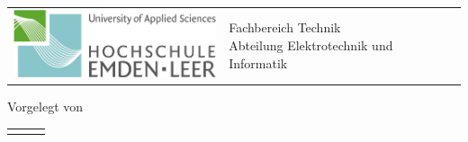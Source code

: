 
\begin{titlepage}

	\hspace{-1.0cm}
	\begin{tabular}{p{8.0cm} p{8.0cm}}
		\includegraphics[width = 6.0cm]{03_Ressourcen/Logo/Technik.png} & %
		\parbox[b]{8.0cm}{
		{\large  Fachbereich Technik }                                    \\ %
		{\large  Abteilung Elektrotechnik und Informatik } %
		}                                                                 \\
		\\
		\hline
	\end{tabular}
	\begin{center}

		\vspace{2.5cm}
		\LARGE{\textsc{\praktikumstitel}}
		\ifx\semester\empty\else\LARGE{\textsc{\semester}}\fi

		\vspace{2cm}%
		\ifx\versuchsnummer\empty\else\LARGE{\textsc{\versuchsnummer}}\fi
		\LARGE{\versuchstitel}

		\vspace{4cm}%
		\large

		\ifx\gruppe\empty\else\gruppe\fi
		\studiengang
		\vspace{0.5cm}

		Vorgelegt von\\

		\begin{table}[!ht]
			\centering
			\begin{tabular}{rll}
				\vornameStudZwei & \nachnameStudZwei & \matrikelnummerStudZwei %
			\end{tabular}
		\end{table}



\end{center}
\end{titlepage}
